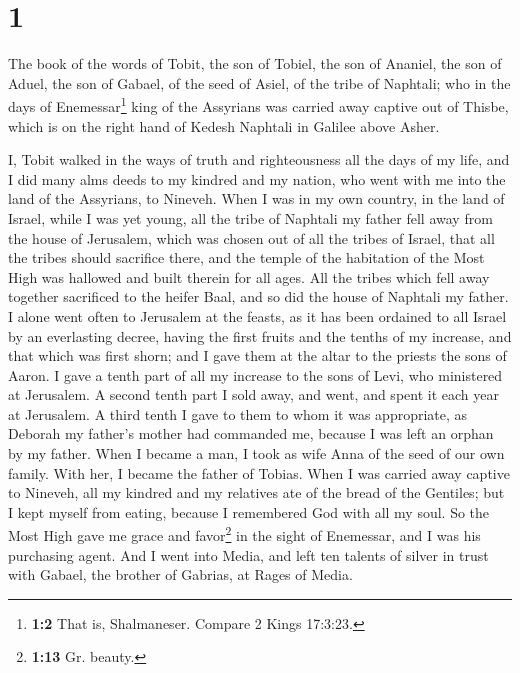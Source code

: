 \hypertarget{section}{%
\section{1}\label{section}}

 The book of the words of Tobit, the son of Tobiel, the
son of Ananiel, the son of Aduel, the son of Gabael, of the seed of
Asiel, of the tribe of Naphtali;  who in the days of
Enemessar\footnote{\textbf{1:2} That is, Shalmaneser. Compare 2 Kings
  17:3:23.} king of the Assyrians was carried away captive out of
Thisbe, which is on the right hand of Kedesh Naphtali in Galilee above
Asher.

 I, Tobit walked in the ways of truth and righteousness
all the days of my life, and I did many alms deeds to my kindred and my
nation, who went with me into the land of the Assyrians, to Nineveh.
 When I was in my own country, in the land of Israel,
while I was yet young, all the tribe of Naphtali my father fell away
from the house of Jerusalem, which was chosen out of all the tribes of
Israel, that all the tribes should sacrifice there, and the temple of
the habitation of the Most High was hallowed and built therein for all
ages.  All the tribes which fell away together sacrificed
to the heifer Baal, and so did the house of Naphtali my father.
 I alone went often to Jerusalem at the feasts, as it has
been ordained to all Israel by an everlasting decree, having the first
fruits and the tenths of my increase, and that which was first shorn;
and I gave them at the altar to the priests the sons of Aaron.
 I gave a tenth part of all my increase to the sons of
Levi, who ministered at Jerusalem. A second tenth part I sold away, and
went, and spent it each year at Jerusalem.  A third tenth
I gave to them to whom it was appropriate, as Deborah my father's mother
had commanded me, because I was left an orphan by my father.
 When I became a man, I took as wife Anna of the seed of
our own family. With her, I became the father of Tobias. 
When I was carried away captive to Nineveh, all my kindred and my
relatives ate of the bread of the Gentiles;  but I kept
myself from eating,  because I remembered God with all my
soul.  So the Most High gave me grace and
favor\footnote{\textbf{1:13} Gr. beauty.} in the sight of Enemessar, and
I was his purchasing agent.  And I went into Media, and
left ten talents of silver in trust with Gabael, the brother of Gabrias,
at Rages of Media.

